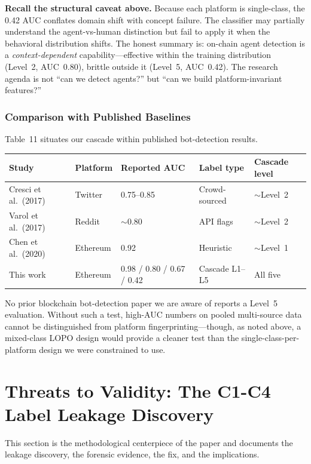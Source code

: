 \documentclass[sigconf,nonacm=false]{acmart}
\begin{document}
\textbf{Recall the structural caveat above.} Because each platform is single-class, the 0.42 AUC conflates domain shift with concept failure. The classifier may partially understand the agent-vs-human distinction but fail to apply it when the behavioral distribution shifts. The honest summary is: on-chain agent detection is a \emph{context-dependent} capability---effective within the training distribution (Level~2, AUC~0.80), brittle outside it (Level~5, AUC~0.42). The research agenda is not ``can we detect agents?'' but ``can we build platform-invariant features?''

\subsubsection{Comparison with Published Baselines}

Table~11 situates our cascade within published bot-detection results.

\begin{table}[h]
\centering
\small
\begin{tabular}{lllll}
\toprule
Study & Platform & Reported AUC & Label type & Cascade level \\
\midrule
Cresci et al.\ (2017) & Twitter & 0.75--0.85 & Crowd-sourced & $\sim$Level~2 \\
Varol et al.\ (2017) & Reddit & $\sim$0.80 & API flags & $\sim$Level~2 \\
Chen et al.\ (2020) & Ethereum & 0.92 & Heuristic & $\sim$Level~1 \\
\midrule
This work & Ethereum & 0.98 / 0.80 / 0.67 / 0.42 & Cascade L1--L5 & All five \\
\bottomrule
\end{tabular}
\end{table}

No prior blockchain bot-detection paper we are aware of reports a Level~5 evaluation. Without such a test, high-AUC numbers on pooled multi-source data cannot be distinguished from platform fingerprinting---though, as noted above, a mixed-class LOPO design would provide a cleaner test than the single-class-per-platform design we were constrained to use.


\section{Threats to Validity: The C1-C4 Label Leakage Discovery}

This section is the methodological centerpiece of the paper and documents the leakage discovery, the forensic evidence, the fix, and the implications.
\end{document}

